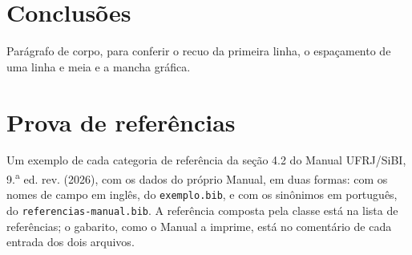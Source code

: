 \documentclass[dsc,pdfa,coorientador,dadoscoleta]{ufrj}
\begin{document}
  \chapter{Conclusões}
  Parágrafo de corpo, para conferir o recuo da primeira linha, o espaçamento de uma linha e meia e a mancha gráfica.

  \chapter{Prova de referências}
  Um exemplo de cada categoria de referência da seção 4.2 do Manual
  UFRJ/SiBI, 9.\textsuperscript{a} ed. rev. (2026), com os dados do
  próprio Manual, em duas formas: com os nomes de campo em inglês, do
  \texttt{exemplo.bib}, e com os sinônimos em português, do
  \texttt{referencias-manual.bib}. A referência composta pela classe
  está na lista de referências; o gabarito, como o Manual a imprime,
  está no comentário de cada entrada dos dois arquivos.
\end{document}

